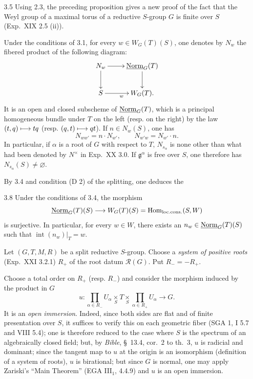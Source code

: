 \begin{remark}{3.5}\label{XXII.3.5}
Using 2.3, the preceding proposition gives a new proof of the fact that the Weyl group of a maximal torus of a reductive $S$-group $G$ is finite over $S$ (Exp.~XIX 2.5 (ii)).{\renewcommand{\thefootnote}{(7)}}
\end{remark}
\label{XXII.3.6}
Under the conditions of 3.1, for every $w\in W_G(T)(S)$, one denotes by $N_w${\renewcommand{\thefootnote}{(8)}} the fibered product of the following diagram:
\[
\xymatrix{N_w\ar[r]\ar[d]&\uNorm_G(T)\ar[d]\\ S\ar[r]_w&W_G(T).}
\]
It is an open and closed subscheme of $\underline{\mathrm{Norm}}_G(T)$, which is a principal homogeneous bundle under $T$ on the left (resp. on the right) by the law $(t,q)\longmapsto tq$ (resp. $(q,t)\longmapsto qt$). If $n\in N_w(S)$, one has
\[
N_{ww'}=n\cdot N_{w'},\qquad N_{w'w}=N_{w'}\cdot n.
\]
\label{XXII.3.7}
In particular, if $\alpha$ is a root of $G$ with respect to $T$, $N_{s_\alpha}$ is none other than what had been denoted by $N^\times$ in Exp.~XX 3.0. If $\mathfrak g^\alpha$ is free over $S$, one therefore has $N_{s_\alpha}(S)\ne\varnothing$.

By 3.4 and condition (D 2) of the splitting, one deduces the
\begin{corollary}{3.8}\label{XXII.3.8}
Under the conditions of 3.4, the morphism
\[
\underline{\mathrm{Norm}}_G(T)(S)\longrightarrow W_G(T)(S)=\operatorname{Hom}_{\mathrm{loc.cons.}}(S,W)
\]
is surjective. In particular, for every $w\in W$, there exists an $n_w\in\underline{\mathrm{Norm}}_G(T)(S)$ such that $\operatorname{int}(n_w)|_T=w$.
\end{corollary}

\label{XXII.sec.4}
\label{XXII.4.1.1}
Let $(G,T,M,R)$ be a split reductive $S$-group. Choose a \emph{system of positive roots} (Exp.~XXI 3.2.1) $R_+$ of the root datum $\mathscr R(G)$. Put $R_-=-R_+$.

Choose a total order on $R_+$ (resp. $R_-$) and consider the morphism induced by the product in $G$
\[
u:\prod_{\alpha\in R_-}U_\alpha\underset S\times T\underset S\times\prod_{\alpha\in R_+}U_\alpha\to G.
\]
It is an \emph{open immersion}. Indeed, since both sides are flat and of finite presentation over $S$, it suffices to verify this on each geometric fiber (SGA 1, I 5.7 and VIII 5.4); one is therefore reduced to the case where $S$ is the spectrum of an algebraically closed field; but, by \textit{Bible}, \S~13.4, cor.~2 to th.~3, $u$ is radicial and dominant; since the tangent map to $u$ at the origin is an isomorphism (definition of a system of roots), $u$ is birational; but since $G$ is normal, one may apply Zariski's ``Main Theorem'' (EGA III$_1$, 4.4.9) and $u$ is an open immersion.

